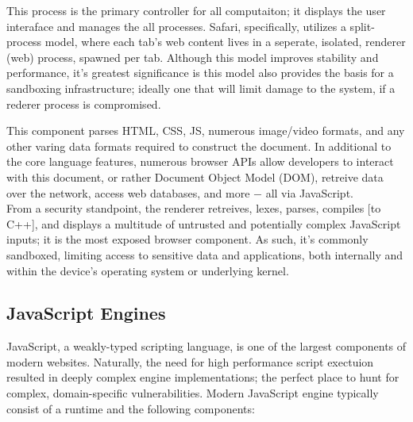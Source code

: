 %
This process is the primary controller for all computaiton; it displays the user interaface and
manages the all processes. Safari, specifically, utilizes a split-process model\cite{wk2}, where
each tab's web content lives in a seperate, isolated, renderer (web) process, spawned per tab.
Although this model improves stability and performance, it's greatest significance is this model
also provides the basis for a sandboxing infrastructure; ideally one that will limit damage
to the system, if a rederer process is compromised.

%
This component parses \textsc{HTML}, \textsc{CSS}, \textsc{JS}, numerous image/video formats,
and any other varing data formats required to construct the document.
In additional to the core language features, numerous browser APIs allow
developers to interact with this document, or rather Document Object Model
(DOM), retreive data over the network, access web databases, and
more $-$  all via JavaScript. \\

From a security standpoint, the renderer retreives, lexes, parses, compiles [to C++], and
displays a multitude of untrusted and potentially complex JavaScript inputs; it is the most
exposed browser component. As such, it's commonly sandboxed\protect\footnotemark, limiting
access to sensitive data and applications, both internally and within the device's operating
system or underlying kernel.

\subsection{JavaScript Engines}
JavaScript, a weakly-typed scripting language, is one of the largest components of modern websites.
Naturally, the need for high performance script exectuion resulted in deeply complex engine
implementations; the perfect place to hunt for complex, domain-specific vulnerabilities. Modern
JavaScript engine typically consist of a runtime and the following components:

